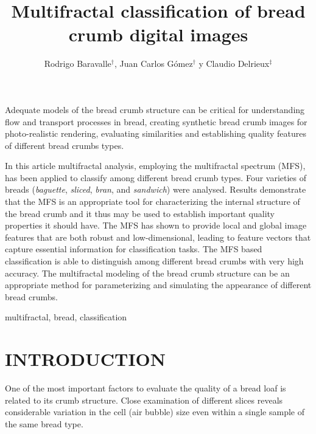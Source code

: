\documentclass[a4paper,10pt]{article}
\affiliation{
\dag Laboratorio de Sistemas Din\'amicos y Procesamiento de Informaci\'on \\
     FCEIA, Universidad Nacional de Rosario, - CIFASIS - CONICET \\
     \{baravalle,gomez\}@cifasis-conicet.gov.ar \\
\ddag DIEC, Universidad Nacional del Sur - IIIE-CONICET \\
    {\ cad@uns.edu.ar}
}
\begin{document}
\title{Multifractal classification of bread crumb digital images}
\author{Rodrigo Baravalle$^{\dag }$, Juan Carlos G\'omez$^{\dag }$ y Claudio Delrieux$^{\ddag }$}
\maketitle


\balance

\abstract
Adequate models of the bread crumb structure can be critical for understanding flow and transport
processes in bread, creating synthetic bread crumb images for photo-realistic rendering, evaluating similarities and establishing quality features of different bread crumbs types.

In this article multifractal analysis, employing the multifractal spectrum (MFS), has been applied to classify among different bread crumb types. Four varieties of breads ({\em baguette}, {\em sliced}, {\em bran}, and {\em sandwich}) were analysed. Results demonstrate that the MFS is an appropriate tool for characterizing the internal structure of the bread crumb and it thus may be used to establish important quality properties it should have. The MFS has shown to provide local and global image features that are both robust and low-dimensional, leading to feature vectors that capture essential information for classification tasks. The MFS based classification is able to distinguish among different bread crumbs with very high accuracy. The multifractal modeling of the bread crumb structure can be an appropriate method for parameterizing and simulating the appearance of different bread crumbs.
\endabstract

\keywords
multifractal, bread, classification
\endpalabras

\section{INTRODUCTION}
One of the most important factors to evaluate the quality of a bread loaf is related to its crumb structure. Close examination of different slices reveals considerable variation in the cell (air bubble) size even within a single sample of the same bread type. 
\end{document}
